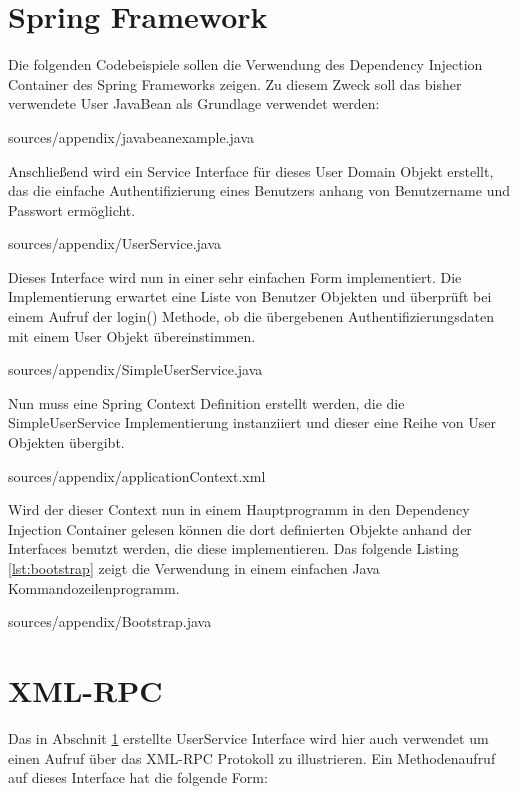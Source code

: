 \label{chap:appendix}

\section{Spring Framework}\label{app:spring}
Die folgenden Codebeispiele sollen die Verwendung des Dependency Injection
Container des Spring Frameworks zeigen. Zu diesem Zweck soll das bisher
verwendete User JavaBean als Grundlage verwendet werden:


{sources/appendix/javabeanexample.java}

Anschließend wird ein Service Interface für dieses User Domain Objekt erstellt,
das die einfache Authentifizierung eines Benutzers anhang von Benutzername und
Passwort ermöglicht.

\lstset{language=Java}
 {sources/appendix/UserService.java}

Dieses Interface wird nun in einer sehr einfachen Form implementiert. Die
Implementierung erwartet eine Liste von Benutzer Objekten und überprüft bei
einem Aufruf der login() Methode, ob die übergebenen Authentifizierungsdaten
mit einem User Objekt übereinstimmen.

 {sources/appendix/SimpleUserService.java}

Nun muss eine Spring Context Definition erstellt werden, die die
SimpleUserService Implementierung instanziiert und dieser eine Reihe von User
Objekten übergibt.

\lstset{language=XML}
 {sources/appendix/applicationContext.xml}

Wird der dieser Context nun in einem Hauptprogramm in den Dependency Injection
Container gelesen können die dort definierten Objekte anhand der Interfaces
benutzt werden, die diese implementieren. Das folgende Listing
\ref{lst:bootstrap} zeigt die Verwendung in einem einfachen Java
Kommandozeilenprogramm.

\lstset{language=Java}
 {sources/appendix/Bootstrap.java}

\pagebreak
\section{XML-RPC}
Das in Abschnit \ref{app:spring} erstellte UserService Interface wird hier auch
verwendet um einen Aufruf über das XML-RPC Protokoll zu illustrieren. Ein
Methodenaufruf auf dieses Interface hat die folgende Form:

